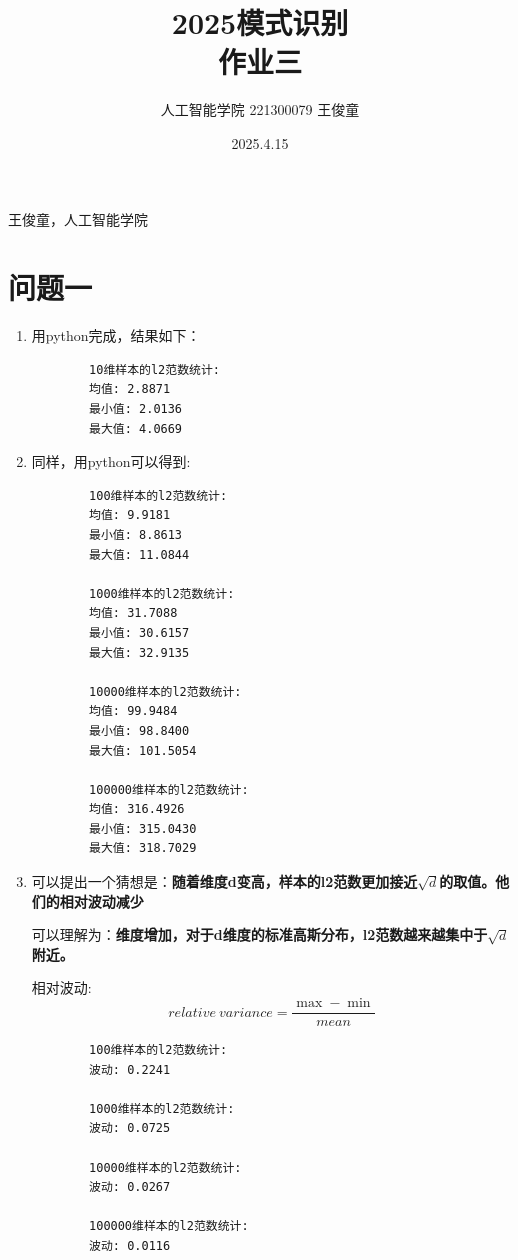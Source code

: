 \documentclass[answers]{exam}  %
\title{2025模式识别 \\ 作业三}
\date{2025.4.15}
\author{人工智能学院 221300079 王俊童}
\begin{document}
{} 王俊童，人工智能学院
\section{问题一}
\begin{enumerate}[label=\alph*.] 
    \item 用python完成，结果如下：
    \begin{lstlisting}
        10维样本的l2范数统计:
        均值: 2.8871
        最小值: 2.0136
        最大值: 4.0669
    \end{lstlisting}
    \item 同样，用python可以得到:
    \begin{lstlisting}
        100维样本的l2范数统计:
        均值: 9.9181
        最小值: 8.8613
        最大值: 11.0844

        1000维样本的l2范数统计:
        均值: 31.7088
        最小值: 30.6157
        最大值: 32.9135

        10000维样本的l2范数统计:
        均值: 99.9484
        最小值: 98.8400
        最大值: 101.5054

        100000维样本的l2范数统计:
        均值: 316.4926
        最小值: 315.0430
        最大值: 318.7029
    \end{lstlisting}
    \item 可以提出一个猜想是：\textbf{随着维度d变高，样本的l2范数更加接近$\sqrt{d}$的取值。他们的相对波动减少}
    \par 可以理解为：\textbf{维度增加，对于d维度的标准高斯分布，l2范数越来越集中于$\sqrt{d}$附近。}
    \par 相对波动:
    \begin{equation*}
        relative\ variance = \frac{\max - \min}{mean}
    \end{equation*}
    \begin{lstlisting}
        100维样本的l2范数统计:
        波动: 0.2241

        1000维样本的l2范数统计:
        波动: 0.0725

        10000维样本的l2范数统计:
        波动: 0.0267

        100000维样本的l2范数统计:
        波动: 0.0116
    \end{lstlisting}


\end{enumerate}
\end{document}
